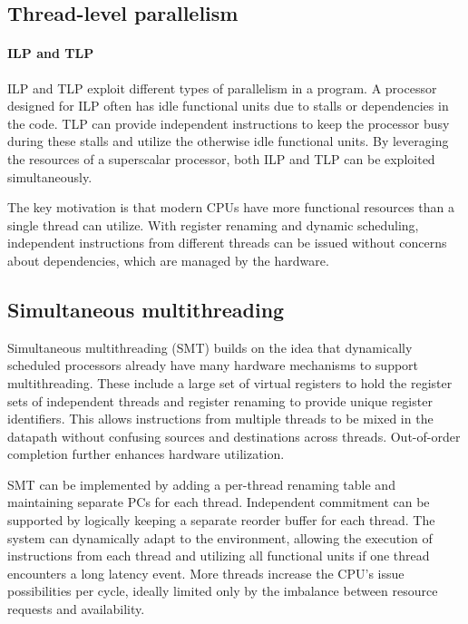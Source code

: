 \subsection{Thread-level parallelism}

\paragraph*{ILP and TLP}
ILP and TLP exploit different types of parallelism in a program. 
A processor designed for ILP often has idle functional units due to stalls or dependencies in the code. 
TLP can provide independent instructions to keep the processor busy during these stalls and utilize the otherwise idle functional units. 
By leveraging the resources of a superscalar processor, both ILP and TLP can be exploited simultaneously.

The key motivation is that modern CPUs have more functional resources than a single thread can utilize. 
With register renaming and dynamic scheduling, independent instructions from different threads can be issued without concerns about dependencies, which are managed by the hardware.

\subsection{Simultaneous multithreading}
Simultaneous multithreading (SMT) builds on the idea that dynamically scheduled processors already have many hardware mechanisms to support multithreading. 
These include a large set of virtual registers to hold the register sets of independent threads and register renaming to provide unique register identifiers. 
This allows instructions from multiple threads to be mixed in the datapath without confusing sources and destinations across threads. 
Out-of-order completion further enhances hardware utilization.

SMT can be implemented by adding a per-thread renaming table and maintaining separate PCs for each thread. 
Independent commitment can be supported by logically keeping a separate reorder buffer for each thread. 
The system can dynamically adapt to the environment, allowing the execution of instructions from each thread and utilizing all functional units if one thread encounters a long latency event. 
More threads increase the CPU's issue possibilities per cycle, ideally limited only by the imbalance between resource requests and availability.